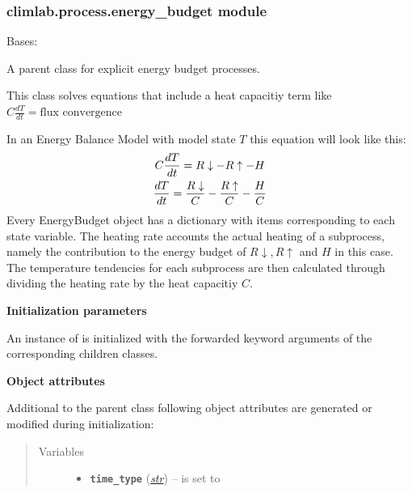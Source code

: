 \documentclass[letterpaper,10pt,english]{sphinxmanual}
\begin{document}
\subsubsection{climlab.process.energy\_budget module}
\label{api/climlab.process:module-climlab.process.energy_budget}\label{api/climlab.process:climlab-process-energy-budget-module}

\begin{fulllineitems}
\label{api/climlab.process:climlab.process.energy_budget.EnergyBudget}
Bases: {\hyperref[api/climlab.process:climlab.process.time_dependent_process.TimeDependentProcess]{\emph{}}}

A parent class for explicit energy budget processes.

This class solves equations that include a heat capacitiy term like
\(C \frac{dT}{dt} = \textrm{flux convergence}\)

In an Energy Balance Model with model state \(T\) this equation 
will look like this:
\begin{gather}
\begin{split}C \frac{dT}{dt} = R\downarrow - R\uparrow - H  \end{split}\notag\\\begin{split}\frac{dT}{dt} = \frac{R\downarrow}{C} - \frac{R\uparrow}{C} - \frac{H}{C}\end{split}\notag
\end{gather}
Every EnergyBudget object has a  dictionary with items 
corresponding to each state variable. The heating rate accounts the actual 
heating of a subprocess, namely the contribution to the energy budget 
of \(R\downarrow, R\uparrow\) and \(H\) in this case.
The temperature tendencies for each subprocess are then calculated 
through dividing the heating rate by the heat capacitiy \(C\).

\textbf{Initialization parameters}

An instance of  is initialized with the forwarded 
keyword arguments  of the corresponding children classes.

\textbf{Object attributes}

Additional to the parent class 
following object attributes are generated or modified during initialization:
\begin{quote}\begin{description}
\item[{Variables}] \leavevmode\begin{itemize}
\item {} 
\textbf{\texttt{time\_type}} (\href{http://docs.python.org/2.7/library/functions.html\#str}{\emph{str}}) -- is set to 


\end{itemize}
\end{description}
\end{quote}
\end{fulllineitems}
\end{document}
